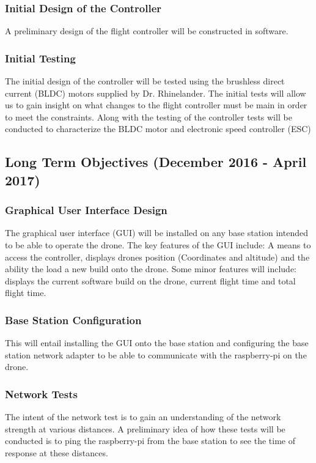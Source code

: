 \subsubsection{Initial Design of the Controller} 
A preliminary design of the flight controller will be constructed in software. 

\subsubsection{Initial Testing} 
The initial design of the controller will be tested using the brushless direct current (BLDC) motors  supplied by Dr. Rhinelander. The initial tests will allow us to gain insight on what changes to the flight controller must be main in order to meet the constraints. Along with the testing of the controller tests will be conducted to characterize the BLDC motor and electronic speed controller (ESC) 

\subsection{Long Term Objectives (December 2016 - April 2017)}
\subsubsection{Graphical User Interface Design}
The graphical user interface (GUI) will be installed on any base station intended to be able to operate the drone. The key features of the GUI include: A means to access the controller, displays drones position (Coordinates and altitude) and the ability the load a new build onto the drone. Some minor features will include: displays the current software build on the drone, current flight time and total flight time.
 
\subsubsection{Base Station Configuration}
This will entail installing the GUI onto the base station and configuring the base station network adapter to be able to communicate with the raspberry-pi on the drone. 

\subsubsection{Network Tests}
The intent of the network test is to gain an understanding of the network strength at various distances. A preliminary idea of how these tests will be conducted is to ping the raspberry-pi from the base station to see the time of response at these distances. 

